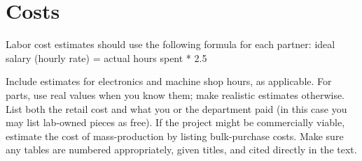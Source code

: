 \documentclass{report}
\begin{document}
    \chapter{Costs}

    Labor cost estimates should use the following formula for each partner: ideal salary (hourly rate) = actual hours spent * 2.5 
    
    Include estimates for electronics and machine shop hours, as applicable. For parts, use real values when you know them; make realistic estimates otherwise. List both the retail cost and what you or the department paid (in this case you may list lab-owned pieces as free). If the project might be commercially viable, estimate the cost of mass-production by listing bulk-purchase costs. Make sure any tables are numbered appropriately, given titles, and cited directly in the text. 
\end{document}
